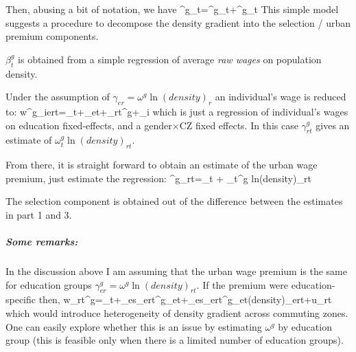 Then, abusing a bit of notation, we have
\beqns
	\beta^g_t=\omega^g_t+\chi^g_t
\eeqns
This simple model suggests a procedure to decompose the density gradient into the selection / urban premium components.
\benu
	\item $\beta_t^g$ is obtained from a simple regression of average \textit{raw wages} on population density.
	\item Under the assumption of $\gamma_{er}=\omega^g\ln(density)_r$ an individual's wage is reduced to:
	\beqns
		w^g_{iert}=\alpha_t+\delta_{et}+\gamma_{rt}^g+\varepsilon_i
	\eeqns
	which is just a regression of individual's wages on education fixed-effects, and a gender$\times$CZ fixed effects. In this case $\gamma_{rt	}^g$ gives an estimate of $\omega^g_t\ln(density)_{rt}$.
	\item From there, it is straight forward to obtain an estimate of the urban wage premium, just estimate the regression:
	\beqns
		\gamma^g_{rt}=\eta_t + \omega_t^g ln(density)_{rt}
	\eeqns 
	\item The selection component is obtained out of the difference between the estimates in part 1 and 3.
\eenu
\subparagraph{Some remarks:}
\bitem 
	\item In the discussion above I am assuming that the urban wage premium is the same for education groups $\gamma_{er}^g=\omega^g\ln(density)_{rt}$. If the premium were education-specific then,
	\beqns
		w_{rt}^g=\alpha_t+\sum_es_{ert}^g\delta_{et}+\sum_es_{ert}\omega^g_{et}\ln(density)_{ert}+u_{rt}
	\eeqns
	which would introduce heterogeneity of density gradient across commuting zones. One can easily explore whether this is an issue by estimating $\omega^g$ by education group (this is feasible only when there is a limited number of education groups).
\eitem 

